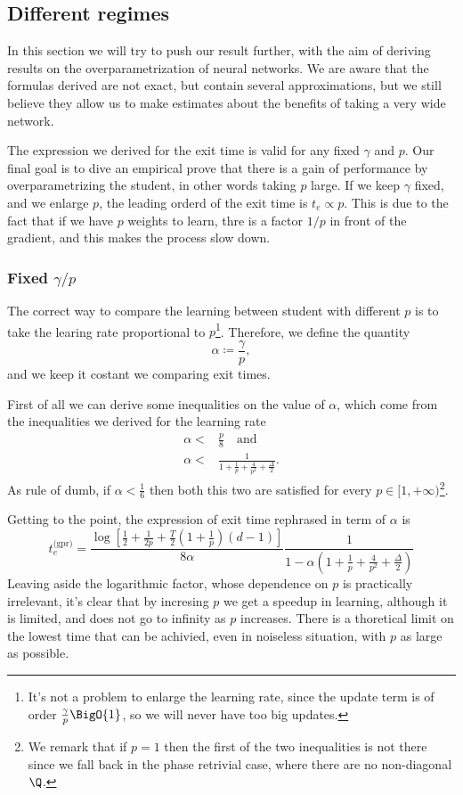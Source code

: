 \subsection{Different regimes}
In this section we will try to push our result further, with the aim of deriving results on the overparametrization of neural networks.
We are aware that the formulas derived are not exact, but contain several approximations,
but we still believe they allow us to make estimates about the benefits of taking a very wide network.

The expression we derived for the exit time is valid for any fixed \(\gamma\) and \(p\).
Our final goal is to dive an empirical prove that there is a gain of performance by overparametrizing the student,
in other words taking \(p\) large. If we keep \(\gamma\) fixed, and we enlarge \(p\), the leading orderd of the exit time 
is \(t_e \propto p\). This is due to the fact that if we have \(p\) weights to learn, thre is a factor \(1/p\) in front of the gradient,
and this makes the process slow down. 

\subsubsection{Fixed $\gamma/p$}
The correct way to compare the learning between student with different \(p\) is to take the learing rate proportional to \(p\)\footnote{
  It's not a problem to enlarge the learning rate, since the update term is of order \(\frac{\gamma}{p}\BigO{1}\), so we will never have too big updates.
}.
Therefore, we define the quantity \[\alpha \coloneqq \frac{\gamma}{p},\] and we keep it costant we comparing exit times.

First of all we can derive some inequalities on the value of \(\alpha\),
which come from the inequalities we derived for the learning rate
\[\begin{split}
  \alpha <& \frac{p}{8} \quad\text{and}\\
  \alpha <& \frac{1}{1 +\frac{1}{p} + \frac{4}{p^2} + \frac\Delta2}.
\end{split}\]
As rule of dumb, if \(\alpha<\frac16\) then both this two are satisfied for every \(p\in[1,+\infty)\)\footnote{
  We remark that if \(p=1\) then the first of the two inequalities is not there since we fall back in the 
  phase retrivial case, where there are no non-diagonal \(\Q\).
}. 

Getting to the point, the expression of exit time rephrased in term of \(\alpha\) is 
\[
  t^\text{(gpr)}_e = \frac{\log\left[\frac12+\frac{1}{2p}+\frac{T}{2}\left(1+\frac{1}{p}\right)(d-1)\right]}{8\alpha} \frac{1}{1- \alpha\left(1+\frac{1}{p}+\frac{4}{p^2}+\frac{\Delta}{2}\right)}
\]
Leaving aside the logarithmic factor, whose dependence on \(p\) is practically irrelevant, 
it's clear that by incresing \(p\) we get a speedup in learning, although it is limited, and does not go to infinity as \(p\) increases.
There is a thoretical limit on the lowest time that can be achivied, even in noiseless situation, with \(p\) as large as possible.

